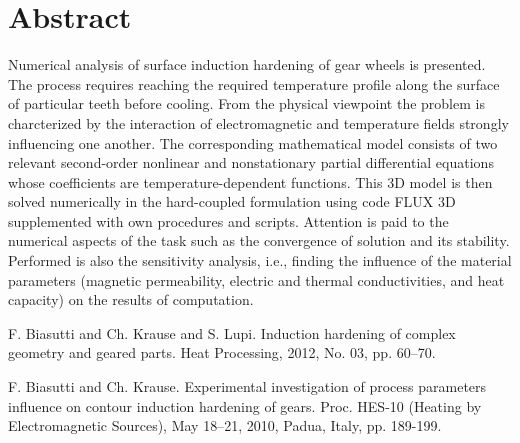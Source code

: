 \documentclass[article,A4,11pt]{llncs}%
\begin{document}
\section*{Abstract}
Numerical analysis of surface induction hardening of gear wheels is presented. The process requires reaching the required temperature profile along the surface of particular teeth before cooling. From the physical viewpoint the problem is charcterized by the interaction of electromagnetic and temperature fields strongly influencing one another. The corresponding mathematical model consists of two relevant second-order nonlinear and nonstationary partial differential equations whose coefficients are temperature-dependent functions. This 3D model is then solved numerically in the hard-coupled formulation using code FLUX 3D supplemented with own procedures and scripts. Attention is paid to the numerical aspects of the task such as the convergence of solution and its stability. Performed is also the sensitivity analysis, i.e., finding the influence of the material parameters (magnetic permeability, electric and thermal conductivities, and heat capacity) on the results of computation.



\begin{thebibliography}{10}
{\sc F. Biasutti and Ch. Krause and S. Lupi}. {Induction hardening of complex geometry and geared parts}. Heat Processing, 2012, No. 03, pp. 60–70.

{\sc F. Biasutti and Ch. Krause}. {Experimental investigation of process parameters influence on contour induction hardening of gears}. Proc. HES-10 (Heating by Electromagnetic Sources), May 18–21, 2010, Padua, Italy, pp. 189-199.
\end{thebibliography}
\end{document}

